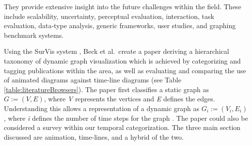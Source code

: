 %
%
%

They provide extensive insight into the future challenges within the field. These include scalability, uncertainty, perceptual evaluation, interaction, task evaluation, data-type analysis, generic frameworks, user studies, and graphing benchmark systems.

Using the SurVis system \cite{beck2016visual}, Beck et al.\ create a paper deriving a hierarchical taxonomy of dynamic graph visualization which is achieved by categorizing and tagging publications within the area, as well as evaluating and comparing the use of animated diagrams against time-line diagrams (see Table \ref{table:literatureBrowsers}). The paper first classifies a static graph as $G := (V,E)$, where \textit{V} represents the vertices and \textit{E} defines the edges. Understanding this allows a representation of a dynamic graph as $G_{i} := (V_{i}, E_{i})$, where \textit{i} defines the number of time steps for the graph \cite{beck2014state}. The paper could also be considered a survey within our temporal categorization.
The three main section discussed are animation, time-lines, and a hybrid of the two.


